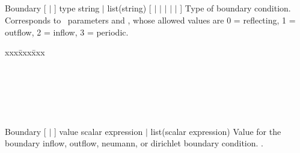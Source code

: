 \documentclass{article}
\begin{document}



\subsection{}

\Parameter
{Boundary}
{[  $|$  ]}
{type}
{string $|$ list(string)}
{ [  $|$ $|$ $|$
  $|$ $|$  ] }
{ Type of boundary condition.  Corresponds to \enzo\ parameters
   and
  , whose allowed values are 0 = reflecting, 1 = outflow, 2 = inflow, 3 = periodic.}
{
\begin{tabbing}
xxx\=xxx\=xxx\kill
  \\
\> \\
\>    \\
\>    \\
\>\>       \\
\>   \code{\}} \\
\code{\}}
\end{tabbing}
}
{}

\Parameter
{Boundary}
{[  $|$  ]}
{value}
{scalar expression $|$ list(scalar expression) }
{}
{ Value for the boundary inflow, outflow, neumann, or dirichlet
  boundary condition.   .}
{}
\end{document}
